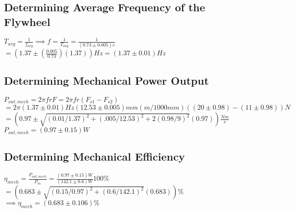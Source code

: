 \documentclass{article}
\begin{document}
\subsection{Determining Average Frequency of the Flywheel}
$T_{avg}=\frac{1}{f_{avg}}\implies f=\frac{1}{T_{avg}}=\frac{1}{(0.73\pm0.005)s}$\\
$=(1.37\pm(\frac{0.005}{0.73})(1.37))Hz=(1.37\pm0.01)Hz$
\subsection{Determining Mechanical Power Output}
$P_{out,mech}=2\pi frF=2\pi fr(F_{s1}-F_{s2})$\\
$=2\pi (1.37\pm0.01)Hz(12.53\pm0.005)mm(m/1000mm)((20\pm0.98)-(11\pm0.98))N$\\
$=(0.97\pm\sqrt{(0.01/1.37)^2+(.005/12.53)^2+2(0.98/9)^2}(0.97))\frac{Nm}{s}$\\
$P_{out,mech}=(0.97\pm0.15)W$
\subsection{Determining Mechanical Efficiency}
$\eta_{mech}=\frac{P_{out,mech}}{P_{in}}=\frac{(0.97\pm0.15)W}{(142.1\pm0.6)W}100\%$
$=(0.683\pm\sqrt{(0.15/0.97)^2+(0.6/142.1)^2}(0.683))\%$\\
$\implies\eta_{mech}=(0.683\pm0.106)\%$



\end{document}
